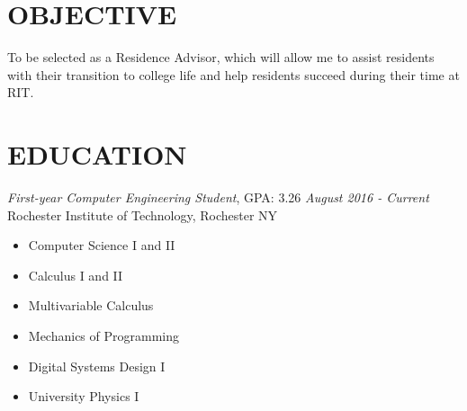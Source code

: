 \documentclass[line,margin]{res}
\begin{document}
\setlength\columnsep{-30pt}
\address{blank}
\address{blank}
\website{}
 
\begin{resume}
 \setlength
 \multicolsep{2pt}

\section{OBJECTIVE} %
	To be selected as a Residence Advisor, which will allow me to assist residents with their transition to college life and help residents succeed during their time at RIT.

\section{EDUCATION} 
	{\sl First-year Computer Engineering Student}, GPA: 3.26 \hfill {\sl August 2016 - Current}\\
                Rochester Institute of Technology, Rochester NY
				\begin{multicols}{2}
					\begin{itemize}
						\itemsep -2pt
						\item[] Computer Science I and II
						\item[] Calculus I and II
						\item[] Multivariable Calculus						
					\end{itemize}
					\begin{itemize}
						\itemsep -2pt
						\item[] Mechanics of Programming
						
						\item[] Digital Systems Design I
						\item[] University Physics I
					\end{itemize}
				\end{multicols}
 	

\end{resume}
\end{document}
